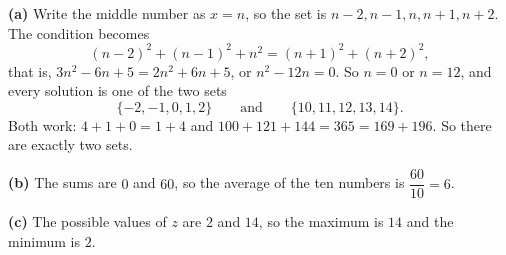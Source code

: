 \textbf{(a)} Write the middle number as $x=n$, so the set is $n-2,n-1,n,n+1,n+2$. The condition becomes
\[
(n-2)^2+(n-1)^2+n^2=(n+1)^2+(n+2)^2,
\]
that is, $3n^2-6n+5=2n^2+6n+5$, or $n^2-12n=0$. So $n=0$ or $n=12$, and every solution is one of the two sets
\[
\{-2,-1,0,1,2\}\qquad\text{and}\qquad\{10,11,12,13,14\}.
\]
Both work: $4+1+0=1+4$ and $100+121+144=365=169+196$. So there are exactly two sets.

\textbf{(b)} The sums are $0$ and $60$, so the average of the ten numbers is $\dfrac{60}{10}=\boxed{6}$.

\textbf{(c)} The possible values of $z$ are $2$ and $14$, so the maximum is $\boxed{14}$ and the minimum is $\boxed{2}$.
